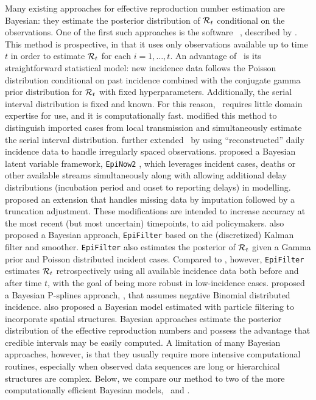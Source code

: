 Many existing approaches for effective reproduction number estimation are
Bayesian: they estimate the posterior distribution of $\mathcal{R}_t$ conditional on
the observations. One of the first such approaches is the software \EpiEstim\
\citep{cori2020package}, described by \citet{cori2013new}. This method is
prospective, in that it uses only observations available up to time $t$ in order to
estimate $\mathcal{R}_t$ for each $i = 1,\ldots, t$. An advantage of \EpiEstim\ is its
straightforward statistical model: new incidence data follows the Poisson
distribution conditional on past incidence combined with the conjugate gamma prior
distribution for $\mathcal{R}_t$ with fixed hyperparameters. Additionally, the serial
interval distribution is fixed and known. For this reason, \EpiEstim\ requires
little domain expertise for use, and it is computationally fast.
\citet{thompson2019improved} modified this method to distinguish imported cases from local transmission and
simultaneously estimate the serial interval distribution.
\citet{nash2023estimating} further extended \EpiEstim\ by using
``reconstructed'' daily incidence data to handle irregularly spaced observations.
% 
\cite{abbott2020estimating} proposed a Bayesian latent variable framework,
\texttt{EpiNow2} \citep{EpiNow2}, which leverages incident cases, deaths or
other available streams simultaneously along with allowing additional delay
distributions (incubation period and onset to reporting delays) in modelling.  
\citet{lison2023generative} proposed an extension that handles missing data by
imputation followed by a truncation adjustment. These modifications are intended
to increase accuracy at the most recent (but most uncertain) timepoints, to aid policymakers.
%
\citet{parag2021improved} also proposed a Bayesian approach, \texttt{EpiFilter}
based on the (discretized) Kalman filter and smoother. \texttt{EpiFilter} also
estimates the posterior of $\mathcal{R}_t$ given a Gamma prior and Poisson distributed
incident cases. Compared to \EpiEstim, however, \texttt{EpiFilter} estimates
$\mathcal{R}_t$ retrospectively using all available incidence data both before and
after time $t$, with the goal of being more robust in low-incidence cases.  
\citet{gressani2022epilps} proposed a Bayesian P-splines approach, \EpiLPS, that
assumes negative Binomial distributed incidence. \citet{trevisin2023spatially}
also proposed a Bayesian model estimated with particle filtering to incorporate
spatial structures.
%
Bayesian approaches estimate the posterior distribution of the effective
reproduction numbers and possess the advantage that credible intervals may be
easily computed. A limitation of many Bayesian approaches, however, is that they
usually require more intensive computational routines, especially when observed
data sequences are long or hierarchical structures are complex.  Below, we
compare our method to two of the more computationally efficient Bayesian models,
\EpiEstim\ and \EpiLPS. 

